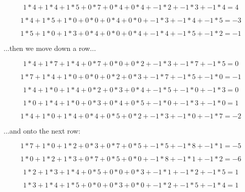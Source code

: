 \documentclass{article}
\begin{document}
\begin{equation}
    1*4 + 1*4 + 1*5 + 0*7 + 0*4 + 0*4 + -1*2 + -1*3 + -1*4 = 4
\end{equation}

\begin{equation}
    1*4 + 1*5 + 1*0 + 0*0 + 0*4 + 0*0 + -1*3 + -1*4 + -1*5 = -3
\end{equation}

\begin{equation}
    1*5 + 1*0 + 1*3 + 0*4 + 0*0 + 0*4 + -1*4 + -1*5 + -1*2 = -1
\end{equation}

\noindent ...then we move down a row...

\begin{equation}
    1*4 + 1*7 + 1*4 + 0*7 + 0*0 + 0*2 + -1*3 + -1*7 + -1*5 = 0
\end{equation}

\begin{equation}
    1*7 + 1*4 + 1*0 + 0*0 + 0*2 + 0*3 + -1*7 + -1*5 + -1*0 = -1
\end{equation}

\begin{equation}
    1*4 + 1*0 + 1*4 + 0*2 + 0*3 + 0*4 + -1*5 + -1*0 + -1*3 = 0
\end{equation}

\begin{equation}
    1*0 + 1*4 + 1*0 + 0*3 + 0*4 + 0*5 + -1*0 + -1*3 + -1*0 = 1
\end{equation}

\begin{equation}
    1*4 + 1*0 + 1*4 + 0*4 + 0*5 + 0*2 + -1*3 + -1*0 + -1*7 = -2
\end{equation}

\noindent ...and onto the next row:

\begin{equation}
    1*7 + 1*0 + 1*2 + 0*3 + 0*7 + 0*5 + -1*5 + -1*8 + -1*1 = -5
\end{equation}

\begin{equation}
    1*0 + 1*2 + 1*3 + 0*7 + 0*5 + 0*0 + -1*8 + -1*1 + -1*2 = -6
\end{equation}

\begin{equation}
    1*2 + 1*3 + 1*4 + 0*5 + 0*0 + 0*3 + -1*1 + -1*2 + -1*5 = 1
\end{equation}

\begin{equation}
    1*3 + 1*4 + 1*5 + 0*0 + 0*3 + 0*0 + -1*2 + -1*5 + -1*4 = 1
\end{equation}
\end{document}
